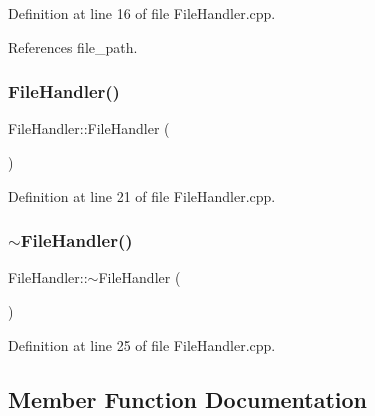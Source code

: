 Definition at line 16 of file File\+Handler.\+cpp.



References file\+\_\+path.

\mbox{\label{class_file_handler_a0d1ac8e9911e19255e8b2d99c2d93f43}} 
\subsubsection{\texorpdfstring{File\+Handler()}{FileHandler()}\hspace{0.1cm}{\footnotesize\ttfamily [2/2]}}
{\footnotesize\ttfamily File\+Handler\+::\+File\+Handler (\begin{DoxyParamCaption}{ }\end{DoxyParamCaption})}



Definition at line 21 of file File\+Handler.\+cpp.

\mbox{\label{class_file_handler_a1ce10cd0ad31b313a8d526fba6f1e676}} 
\subsubsection{\texorpdfstring{$\sim$\+File\+Handler()}{~FileHandler()}}
{\footnotesize\ttfamily File\+Handler\+::$\sim$\+File\+Handler (\begin{DoxyParamCaption}{ }\end{DoxyParamCaption})\hspace{0.3cm}{\ttfamily [virtual]}}



Definition at line 25 of file File\+Handler.\+cpp.



\subsection{Member Function Documentation}
\mbox{\label{class_file_handler_ab8bd470616da49ac3fc662f161db4b9b}} 
